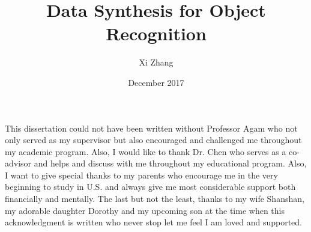\documentclass{iitthesis}
\begin{document}
\title{Data Synthesis for Object Recognition}
\author{Xi Zhang}
\date{December 2017}
\copyrightnoticetrue      %
\maketitle                %


\prelimpages         %


\begin{acknowledgement}     %
\par  This dissertation could not have been written without Professor Agam
who not only served as my supervisor but also encouraged and
challenged me throughout my academic program. Also, I would like to thank Dr. Chen who serves as a co-advisor and helps and discuss with me throughout my educational program.
Also, I want to give special thanks to my parents who encourage me in the very beginning to study in U.S. and always give me most considerable support both financially and mentally. The last but not the least, thanks to my wife Shanshan, my adorable daughter Dorothy and my upcoming son at the time when this acknowledgment is written who
never stop let me feel I am loved and supported.  
\end{acknowledgement}


\tableofcontents
\clearpage

\listoftables
\clearpage

\listoffigures
\clearpage


%

 \clearpage
\end{document}
